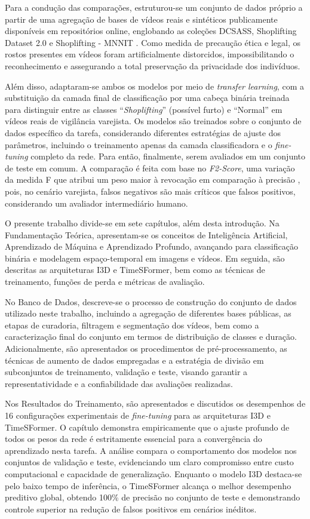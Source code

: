 \documentclass[12pt, %
openright, 
oneside, %
a4paper,    %
brazil]{facom-ufu-abntex2}
\begin{document}
Para a condução das comparações, estruturou-se um conjunto de dados próprio a partir de uma agregação de bases de vídeos reais e sintéticos publicamente disponíveis em repositórios online, englobando as coleções DCSASS, Shoplifting Dataset 2.0 e Shoplifting - MNNIT \cite{dcsass, shoplifting_20, shoplifting_mnnit}. Como medida de precaução ética e legal, os rostos presentes em vídeos foram artificialmente distorcidos, impossibilitando o reconhecimento e assegurando a total preservação da privacidade dos indivíduos.

Além disso, adaptaram-se ambos os modelos por meio de \textit{transfer learning}, com a substituição da camada final de classificação por uma cabeça binária treinada para distinguir entre as classes “\textit{Shoplifting}” (possível furto) e “Normal” em vídeos reais de vigilância varejista. Os modelos são treinados sobre o conjunto de dados específico da tarefa, considerando diferentes estratégias de ajuste dos parâmetros, incluindo o treinamento apenas da camada classificadora e o \textit{fine-tuning} completo da rede. Para então, finalmente, serem avaliados em um conjunto de teste em comum. A comparação é feita com base no \textit{F2-Score}, uma variação da medida F que atribui um peso maior à revocação em comparação à precisão \cite{f2}, pois, no cenário varejista, falsos negativos são mais críticos que falsos positivos, considerando um avaliador intermediário humano.

O presente trabalho divide-se em sete capítulos, além desta introdução. Na Fundamentação Teórica, apresentam-se os conceitos de Inteligência Artificial, Aprendizado de Máquina e Aprendizado Profundo, avançando para classificação binária e modelagem espaço-temporal em imagens e vídeos. Em seguida, são descritas as arquiteturas I3D e TimeSFormer, bem como as técnicas de treinamento, funções de perda e métricas de avaliação.

No Banco de Dados, descreve-se o processo de construção do conjunto de dados utilizado neste trabalho, incluindo a agregação de diferentes bases públicas, as etapas de curadoria, filtragem e segmentação dos vídeos, bem como a caracterização final do conjunto em termos de distribuição de classes e duração. Adicionalmente, são apresentados os procedimentos de pré-processamento, as técnicas de aumento de dados empregadas e a estratégia de divisão em subconjuntos de treinamento, validação e teste, visando garantir a representatividade e a confiabilidade das avaliações realizadas.

Nos Resultados do Treinamento, são apresentados e discutidos os desempenhos de 16 configurações experimentais de \textit{fine-tuning} para as arquiteturas I3D e TimeSFormer. O capítulo demonstra empiricamente que o ajuste profundo de todos os pesos da rede é estritamente essencial para a convergência do aprendizado nesta tarefa. A análise compara o comportamento dos modelos nos conjuntos de validação e teste, evidenciando um claro compromisso entre custo computacional e capacidade de generalização. Enquanto o modelo I3D destaca-se pelo baixo tempo de inferência, o TimeSFormer alcança o melhor desempenho preditivo global, obtendo 100\% de precisão no conjunto de teste e demonstrando controle superior na redução de falsos positivos em cenários inéditos.
\end{document}
